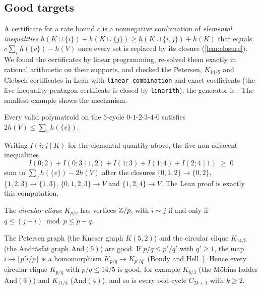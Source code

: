 \subsection{Good targets}\label{sec:targets}

A certificate for a rate bound $c$ is a nonnegative combination of \emph{elemental inequalities}
$h(K\cup\{i\})+h(K\cup\{j\})\ge h(K\cup\{i,j\})+h(K)$ that equals $c\sum_vh(\{v\})-h(V)$ once every set is replaced by its
closure (\cref{lem:closure}). We found the certificates by linear programming, re-solved them exactly in rational
arithmetic on their supports, and checked the Petersen, $K_{14/5}$ and Clebsch certificates in Lean with
\texttt{linear\_combination} and exact coefficients (the five-inequality pentagon certificate is closed by
\texttt{linarith}); the generator is . The smallest example shows the mechanism.

\begin{proposition}\label{prop:C5}
Every valid polymatroid on the $5$-cycle $0\text{-}1\text{-}2\text{-}3\text{-}4\text{-}0$ satisfies $2h(V)\le\sum_vh(\{v\})$.
\end{proposition}

\begin{outline}
Writing $I(i;j\mid K)$ for the elemental quantity above, the five non-adjacent inequalities
\[
  I(0;2)+I(0;3\mid1,2)+I(1;3)+I(1;4)+I(2;4\mid1)\;\ge\;0
\]
sum to $\sum_vh(\{v\})-2h(V)$ after the closures $\{0,1,2\}\to\{0,2\}$, $\{1,2,3\}\to\{1,3\}$,
$\{0,1,2,3\}\to V$ and $\{1,2,4\}\to V$. The Lean proof is exactly this computation.
\end{outline}

The \emph{circular clique} $K_{p/q}$ has vertices $\mathbb{Z}/p$, with $i\sim j$ if and only if $q\le(j-i)\bmod p\le p-q$.

\begin{proposition}\label{prop:targets}
The Petersen graph (the Kneser graph $K(5,2)$) and the circular clique $K_{14/5}$ (the Andrásfai graph
$\mathrm{And}(5)$) are good. If $p/q\le p'/q'$ with $q'\ge1$, the map $i\mapsto\lfloor p'i/p\rfloor$ is a homomorphism
$K_{p/q}\to K_{p'/q'}$ (Bondy and Hell~\cite{BondyHell1990}). Hence every circular clique $K_{p/q}$ with $p/q\le14/5$ is
good, for example $K_{8/3}$ (the Möbius ladder $\mathrm{And}(3)$) and $K_{11/4}$ ($\mathrm{And}(4)$), and so is every
odd cycle $C_{2k+1}$ with $k\ge2$.
\end{proposition}

